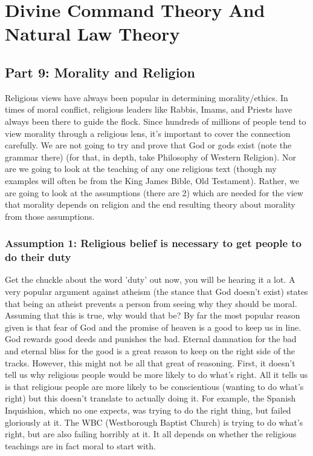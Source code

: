 \part{Divine Command Theory And Natural Law Theory}
\label{ch.mod3}
\chapter{Part 9: Morality and Religion}
Religious views have always been popular in determining morality/ethics. In times of moral conflict, religious leaders like Rabbis, Imams, and Priests have always been there to guide the flock. Since hundreds of millions of people tend to view morality through a religious lens, it’s important to cover the connection carefully. We are not going to try and prove that God or gods exist (note the grammar there) (for that, in depth, take Philosophy of Western Religion). Nor are we going to look at the teaching of any one religious text (though my examples will often be from the King James Bible, Old Testament).  Rather, we are going to look at the assumptions (there are 2) which are needed for the view that morality depends on religion and the end resulting theory about morality from those assumptions.
\section{Assumption 1: Religious belief is necessary to get people to do their duty}

Get the chuckle about the word 'duty' out now, you will be hearing it a lot. A very popular argument against atheism (the stance that God doesn’t exist) states that being an atheist prevents a person from seeing why they should be moral. Assuming that this is true, why would that be? By far the most popular reason given is that fear of God and the promise of heaven is a good to keep us in line. God rewards good deeds and punishes the bad. Eternal damnation for the bad and eternal bliss for the good is a great reason to keep on the right side of the tracks. However, this might not be all that great of reasoning. First, it doesn’t tell us why religious people would be more likely to do what’s right. All it tells us is that religious people are more likely to be conscientious (wanting to do what’s right) but this doesn’t translate to actually doing it. For example, the Spanish Inquishion, which no one expects, was trying to do the right thing, but failed gloriously at it. The WBC (Westborough Baptist Church) is trying to do what’s right, but are also failing horribly at it. It all depends on whether the religious teachings are in fact moral to start with.
